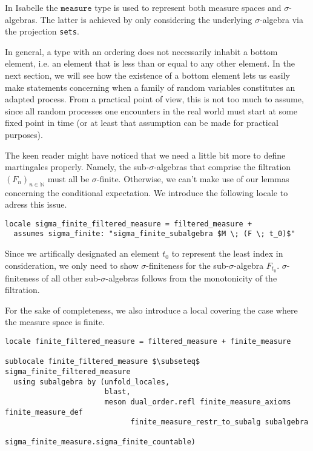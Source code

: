 \begin{remark}
	In Isabelle the $\texttt{measure}$ type is used to represent both measure spaces and $\sigma$-algebras. The latter is achieved by only considering the underlying $\sigma$-algebra via the projection \texttt{sets}.
\end{remark}

In general, a type with an ordering does not necessarily inhabit a bottom element, i.e. an element that is less than or equal to any other element. In the next section, we will see how the existence of a bottom element lets us easily make statements concerning when a family of random variables constitutes an adapted process. From a practical point of view, this is not too much to assume, since all random processes one encounters in the real world must start at some fixed point in time (or at least that assumption can be made for practical purposes).

The keen reader might have noticed that we need a little bit more to define martingales properly. Namely, the sub-$\sigma$-algebras that comprise the filtration $(F_n)_{n \in \mathbb{N}}$ must all be $\sigma$-finite. Otherwise, we can't make use of our lemmas concerning the conditional expectation. We introduce the following locale to adress this issue.

\begin{isadefinition}
{\small
\begin{lstlisting}[style=isabelle]
locale sigma_finite_filtered_measure = filtered_measure +
  assumes sigma_finite: "sigma_finite_subalgebra $M \; (F \; t_0)$"
  \end{lstlisting}
}
\end{isadefinition}

\begin{remark}
	Since we artifically designated an element $t_0$ to represent the least index in consideration, we only need to show $\sigma$-finiteness for the sub-$\sigma$-algebra $F_{t_0}$. $\sigma$-finiteness of all other sub-$\sigma$-algebras follows from the monotonicity of the filtration.
\end{remark}

For the sake of completeness, we also introduce a local covering the case where the measure space is finite.

\begin{isadefinition}
{\small
\begin{lstlisting}[style=isabelle]
locale finite_filtered_measure = filtered_measure + finite_measure

sublocale finite_filtered_measure $\subseteq$ sigma_finite_filtered_measure 
  using subalgebra by (unfold_locales, 
  					   blast, 
					   meson dual_order.refl finite_measure_axioms finite_measure_def 
							 finite_measure_restr_to_subalg subalgebra
							 sigma_finite_measure.sigma_finite_countable)

  \end{lstlisting}
}
\end{isadefinition}


